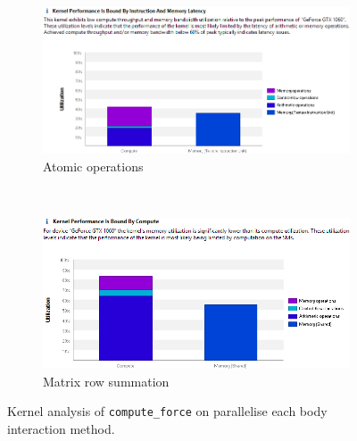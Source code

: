 \documentclass[12pt, a4paper]{article}
\begin{document}
\begin{figure}[ht]
  \centering
  \begin{subfigure}{.85\textwidth}
    \centering
    \includegraphics[width=\textwidth]{images/kernel_analysis_compute_force_nn_atomic.png}
    \caption{Atomic operations} \label{figure:kernel_analysis_compute_force_nn_atomic}
  \end{subfigure}\\ \bigskip
  \begin{subfigure}{.85\textwidth}
    \centering
    \includegraphics[width=\textwidth]{images/kernel_analysis_compute_force_nn_matrix.png}
    \caption{Matrix row summation} \label{figure:kernel_analysis_compute_force_nn_matrix}
  \end{subfigure}
  \caption{Kernel analysis of \texttt{compute\_force} on parallelise each body interaction method.}
\end{figure}
\end{document}
